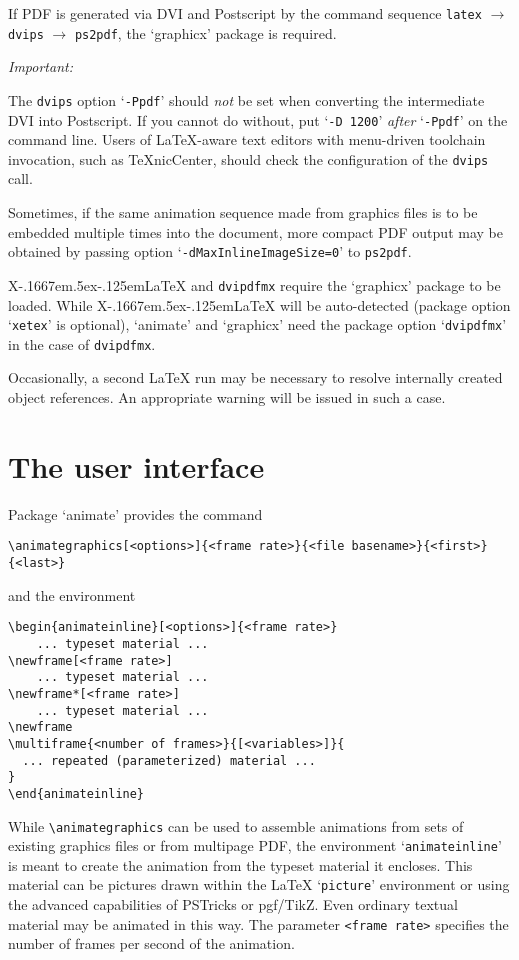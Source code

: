 \documentclass[a4paper]{article}
\def\XeLaTeX{X\kern-.1667em\lower.5ex\hbox{\reflectbox{E}}\kern-.125em\LaTeX}
\begin{document}
If PDF is generated via DVI and Postscript by the command sequence \verb+latex+ $\rightarrow$ \verb+dvips+ $\rightarrow$ \verb+ps2pdf+, the `graphicx' package is required. \begin{animateinline}{1.5}\strut\emph{Important:}\newframe\newframe[5]\end{animateinline} The \verb+dvips+ option `\verb+-Ppdf+' should \emph{not} be set when converting the intermediate DVI into Postscript. If you cannot do without, put `\verb+-D 1200+' \emph{after} `\verb+-Ppdf+' on the command line. Users of \LaTeX-aware text editors with menu-driven toolchain invocation, such as \TeX{}nicCenter, should check the configuration of the \verb+dvips+ call.

Sometimes, if the same animation sequence made from graphics files is to be embedded multiple times into the document, more compact PDF output may be obtained by passing option `\verb+-dMaxInlineImageSize=0+' to \verb+ps2pdf+.

\XeLaTeX{} and \verb+dvipdfmx+ require the `graphicx' package to be loaded. While \XeLaTeX{} will be auto-detected (package option `\verb+xetex+' is optional), `animate' and `graphicx' need the package option `\verb+dvipdfmx+' in the case of \verb+dvipdfmx+.

Occasionally, a second \LaTeX{} run may be necessary to resolve internally created object references. An appropriate warning will be issued in such a case.

\section{The user interface}
Package `animate' provides the command
\begin{verbatim}
\animategraphics[<options>]{<frame rate>}{<file basename>}{<first>}{<last>}
\end{verbatim}
and the environment
\begin{verbatim}
\begin{animateinline}[<options>]{<frame rate>}
    ... typeset material ...
\newframe[<frame rate>]
    ... typeset material ...
\newframe*[<frame rate>]
    ... typeset material ...
\newframe
\multiframe{<number of frames>}{[<variables>]}{
  ... repeated (parameterized) material ...
}
\end{animateinline}
\end{verbatim}

While \verb+\animategraphics+ can be used to assemble animations from sets of existing graphics files or from multipage PDF, the environment `\verb+animateinline+' is meant to create the animation from the typeset material it encloses. This material can be pictures drawn within the \LaTeX{} `\verb+picture+' environment or using the advanced capabilities of PSTricks or pgf/TikZ. Even ordinary textual material may be animated in this way. The parameter \verb+<frame rate>+ specifies the number of frames per second of the animation.
\end{document}
